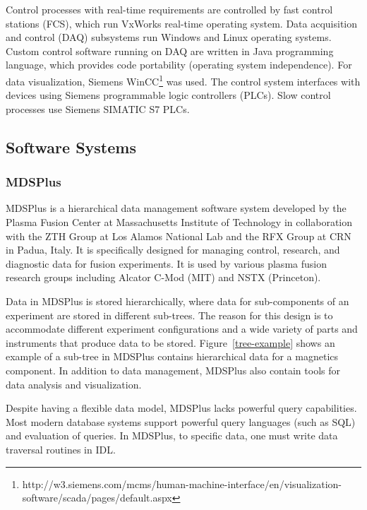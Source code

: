 Control processes with real-time requirements are controlled by fast control stations (FCS), which run VxWorks real-time operating system. Data acquisition and control (DAQ) subsystems run Windows and Linux operating systems. Custom control software running on DAQ are written in Java programming language, which provides code portability (operating system independence). For data visualization, Siemens WinCC\footnote{http://w3.siemens.com/mcms/human-machine-interface/en/visualization-software/scada/pages/default.aspx} was used. The control system interfaces with devices using Siemens programmable logic controllers (PLCs). Slow control processes use Siemens SIMATIC S7 PLCs.

\subsection{Software Systems}

\subsubsection{MDSPlus}

MDSPlus is a hierarchical data management software system developed by the Plasma Fusion Center at Massachusetts Institute of Technology in collaboration with the ZTH Group at Los Alamos National Lab and the RFX Group at CRN in Padua, Italy. It is specifically designed for managing control, research, and diagnostic data for fusion experiments. It is used by various plasma fusion research groups including Alcator C-Mod (MIT) and NSTX (Princeton).

Data in MDSPlus is stored hierarchically, where data for sub-components of an experiment are stored in different sub-trees. The reason for this design is to accommodate different experiment configurations and a wide variety of parts and instruments that produce data to be stored. Figure~\ref{tree-example} shows an example of a sub-tree in MDSPlus contains hierarchical data for a magnetics component. In addition to data management, MDSPlus also contain tools for data analysis and visualization.

Despite having a flexible data model, MDSPlus lacks powerful query capabilities. Most modern database systems support powerful query languages (such as SQL) and evaluation of queries. In MDSPlus, to specific data, one must write data traversal routines in IDL.

